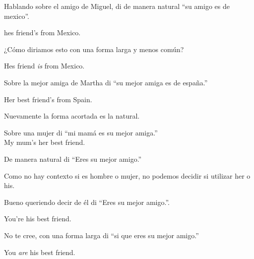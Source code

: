 Hablando sobre el amigo de Miguel, di de manera natural ``su amigo es de
mexico''.

hes friend's from Mexico.

¿Cómo diriamos esto con una forma larga y menos común?

Hes friend \textit{is} from Mexico.

Sobre la mejor amiga de Martha di ``su mejor amiga es de españa.''

Her best friend's from Spain.

Nuevamente la forma acortada es la natural.

Sobre una mujer di ``mi mamá es su mejor amiga.''\\
My mum's her best friend.

De manera natural di ``Eres su mejor amigo.''

Como no hay contexto si es hombre o mujer, no podemos decidir si utilizar
her o his.

Bueno queriendo decir de él di ``Eres su mejor amigo.''.

You're his best friend.

No te cree, con una forma larga di ``si que eres su mejor amigo.''

You \textit{are} his best friend.














